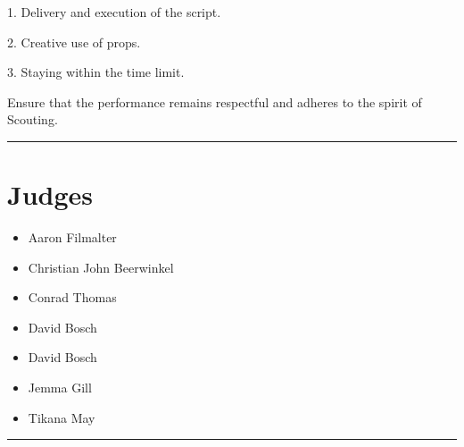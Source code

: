\documentclass[10pt]{article}
\begin{document}
1. Delivery and execution of the script.

2. Creative use of props.

3. Staying within the time limit.

Ensure that the performance remains respectful and adheres to the spirit of Scouting.


\vspace{0.5cm}
	\hrule
	\vspace{0.5cm}
		\section*{\faUsers \: Judges}

		

	\begin{multicols}{2}

		\begin{itemize}
									\item Aaron Filmalter
									\item Christian John Beerwinkel
									\item Conrad Thomas
									\item David Bosch
						\end{itemize}

		\vfill\null
		\columnbreak

		\begin{itemize}
									\item David Bosch
									\item Jemma Gill
									\item Tikana May
						\end{itemize}

		\vfill\null

		\end{multicols}



			\vspace{0.5cm}
	\hrule
	\vspace{0.5cm}
\end{document}
